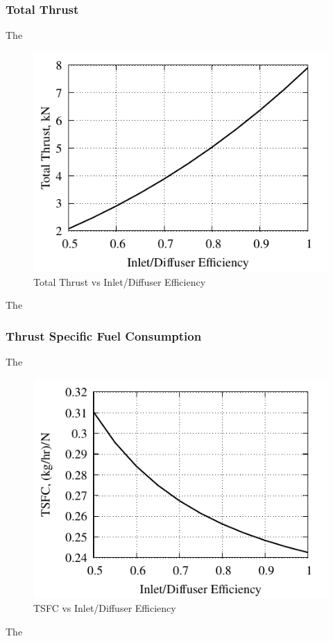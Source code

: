 \documentclass[conf]{new-aiaa} %
\begin{document}
\subsubsection{Total Thrust}
The

\begin{figure}[H] %
    \centering
    \includegraphics[]{media/performance_parameter_files/part_f_T.pdf}
    \caption{\label{fig:partft}Total Thrust vs Inlet/Diffuser Efficiency}
\end{figure}
The

\subsubsection{Thrust Specific Fuel Consumption}
The

\begin{figure}[H] %
    \centering
    \includegraphics[]{media/performance_parameter_files/part_f_TSFC.pdf}
    \caption{\label{fig:partftsfc}TSFC vs Inlet/Diffuser Efficiency}
\end{figure}
The
\end{document}
